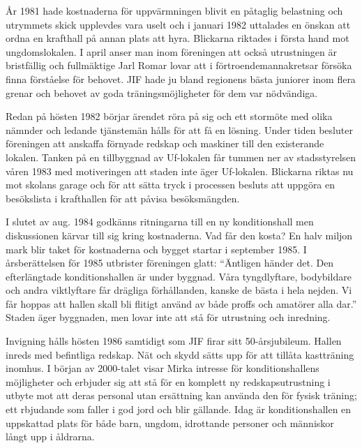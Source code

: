 
År 1981 hade kostnaderna för uppvärmningen blivit en påtaglig belastning och utrymmets skick upplevdes vara uselt och i januari 1982 uttalades en önskan att ordna en krafthall på annan plats att hyra. Blickarna riktades i första hand mot ungdomslokalen. I april anser man inom föreningen att också utrustningen är bristfällig och fullmäktige Jarl Romar lovar att i förtroendemannakretsar försöka finna förståelse för behovet. JIF hade ju bland regionens bästa juniorer inom flera grenar och behovet av goda träningsmöjligheter för dem var nödvändiga.

Redan på hösten 1982 börjar ärendet röra på sig och ett stormöte med olika nämnder och ledande tjänstemän hålls för att få en lösning. Under tiden besluter föreningen att anskaffa förnyade redskap och maskiner till den existerande lokalen. Tanken på en tillbyggnad av Uf-lokalen får tummen ner av stadsstyrelsen våren 1983 med motiveringen att staden inte äger Uf-lokalen. Blickarna riktas nu mot skolans garage och för att sätta tryck i processen besluts att uppgöra en besökslista i krafthallen för att påvisa besöksmängden.

I slutet av aug. 1984 godkänns ritningarna till en ny konditionshall men diskussionen kärvar till sig kring kostnaderna. Vad får den kosta? En halv miljon mark blir taket för kostnaderna och bygget startar i september 1985. I årsberättelsen för 1985 utbrister föreningen glatt: ``Äntligen händer det. Den efterlängtade konditionshallen är under byggnad. Våra tyngdlyftare, bodybildare och andra viktlyftare får drägliga förhållanden, kanske de bästa i hela nejden. Vi får hoppas att hallen skall bli flitigt använd av både proffs och amatörer alla dar.'' Staden äger byggnaden, men lovar inte att stå för utrustning och inredning.

Invigning hålls hösten 1986 samtidigt som JIF firar sitt 50-årsjubileum. Hallen inreds med befintliga redskap. Nät och skydd sätts upp för att tillåta kastträning inomhus. I början av 2000-talet visar Mirka intresse för konditionshallens möjligheter och erbjuder sig att stå för en komplett ny redskapsutrustning i utbyte mot att deras personal utan ersättning kan använda den för fysisk träning; ett rbjudande som faller i god jord och blir gällande. Idag är konditionshallen en uppskattad plats för både barn, ungdom, idrottande personer och människor långt upp i åldrarna.



